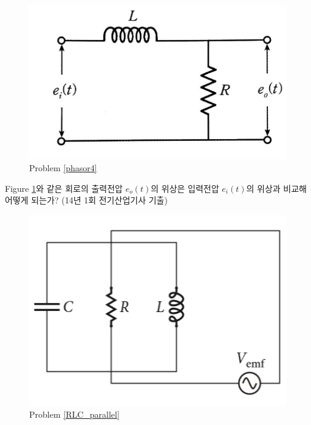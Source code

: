 \begin{problem}\label{phasor4}
\begin{figure}[h]
\centering\includegraphics[scale=0.15]{Pictures/phasor4.jpg}
\caption{Problem \ref{phasor4}}
\label{fig:phasor4}
\end{figure}
Figure \ref{fig:phasor4}와 같은 회로의 출력전압 $e_o(t)$의 위상은 입력전압 $e_i(t)$의 위상과 비교해 어떻게 되는가? (14년 1회 전기산업기사 기출)
\end{problem}
\begin{figure}[h!]
\centering\includegraphics[scale=0.4]{Pictures/parallel_RLC.PNG}
\caption{Problem \ref{RLC_parallel}}
\label{fig:RLC_parallel}
\end{figure}

